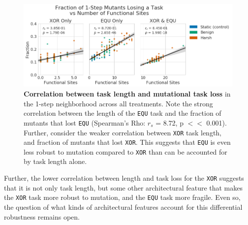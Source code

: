 \documentclass[10pt,letterpaper]{article}
\begin{document}
	\begin{figure}[!h] %
	\includegraphics[trim={0.2cm 0 0 0.2cm},clip,width=0.95\columnwidth]{figures/CE/CCE_frac_1step_vs_func_sites.png}
	\caption{\textbf{Correlation between task length and mutational task loss} in the 1-step neighborhood across all treatments. Note the strong correlation between the length of the \texttt{EQU} task and the fraction of mutants that lost \texttt{EQU} (Spearman's Rho: $r_s$ = 8.72, p $<<$ 0.001). Further, consider the weaker correlation between \texttt{XOR} task length, and fraction of mutants that lost \texttt{XOR}. This suggests that \texttt{EQU} is even less robust to mutation compared to \texttt{XOR} than can be accounted for by task length alone.  
	}\label{fig:CCE_func_vs_single_step}
	\end{figure}	

Further, the lower correlation between length and task loss for the \texttt{XOR} suggests that it is not only task length, but some other architectural feature that makes the \texttt{XOR} task more robust to mutation, and the \texttt{EQU} task more fragile. Even so, the question of what kinds of architectural features account for this differential robustness remains open.
\end{document}
